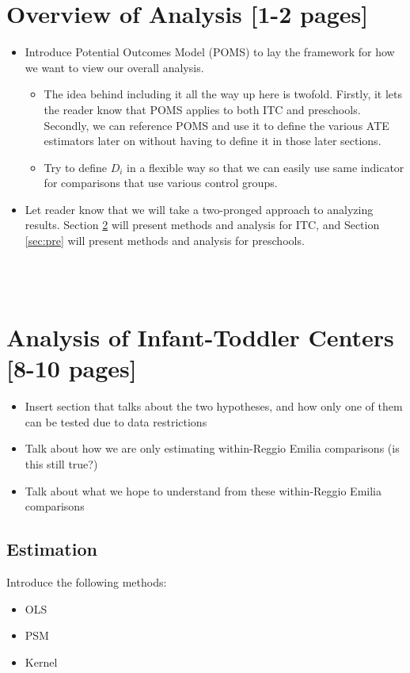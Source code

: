 





\section{Overview of Analysis [1-2 pages]}
\label{sec:Analysis}

\begin{itemize}
	\item Introduce Potential Outcomes Model (POMS) to lay the framework for how we want to view our overall analysis.
	\begin{itemize}
		\item The idea behind including it all the way up here is twofold. Firstly, it lets the reader know that POMS applies to both ITC and preschools. Secondly, we can reference POMS and use it to define the various ATE estimators later on without having to define it in those later sections.
		\item Try to define $D_i$ in a flexible way so that we can easily use same indicator for comparisons that use various control groups.
	\end{itemize} 
	\item Let reader know that we will take a two-pronged approach to analyzing results. Section \ref{sec:ITC} will present methods and analysis for ITC, and Section \ref{sec:pre} will present methods and analysis for preschools.
\end{itemize}
~\\ ~\\

\section{Analysis of Infant-Toddler Centers [8-10 pages]}
\label{sec:ITC}
\begin{itemize}
	\item Insert section that talks about the two hypotheses, and how only one of them can be tested due to data restrictions
	\item Talk about how we are only estimating within-Reggio Emilia comparisons (is this still true?)
	\item Talk about what we hope to understand from these within-Reggio Emilia comparisons
\end{itemize}
\subsection{Estimation} \label{sec:ITCestimations}
Introduce the following methods:
\begin{itemize}
	\item OLS
	\item PSM
	\item Kernel
\end{itemize}

